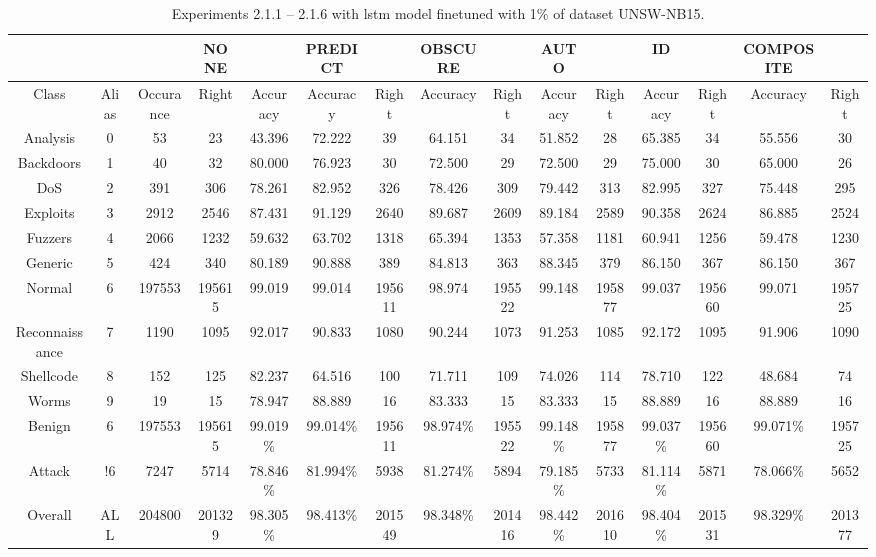 \begin{table}[htb]
    \centering
    \caption{Experiments 2.1.1 – 2.1.6 with \gls{lstm} model finetuned with 1\% of dataset UNSW-NB15.}
    \label{table:results:lstm:flows15_10}
    \begin{tabular}{@{}ccccccccccccccc@{}}
        \toprule
         &  &  & NONE &  & PREDICT &  & OBSCURE &  & AUTO &  & ID &  & COMPOSITE &  \\
        \midrule
        Class &  Alias &  Occurance &  Right &  Accuracy &  Accuracy &  Right &  Accuracy &  Right &  Accuracy &  Right &  Accuracy &  Right &  Accuracy &  Right \\
        Analysis &  0 &  53 &  23 &  43.396 &  72.222 &  39 &  64.151 &  34 &  51.852 &  28 &  65.385 &  34 &  55.556 &  30 \\
        Backdoors &  1 &  40 &  32 &  80.000 &  76.923 &  30 &  72.500 &  29 &  72.500 &  29 &  75.000 &  30 &  65.000 &  26 \\
        DoS &  2 &  391 &  306 &  78.261 &  82.952 &  326 &  78.426 &  309 &  79.442 &  313 &  82.995 &  327 &  75.448 &  295 \\
        Exploits &  3 &  2912 &  2546 &  87.431 &  91.129 &  2640 &  89.687 &  2609 &  89.184 &  2589 &  90.358 &  2624 &  86.885 &  2524 \\
        Fuzzers &  4 &  2066 &  1232 &  59.632 &  63.702 &  1318 &  65.394 &  1353 &  57.358 &  1181 &  60.941 &  1256 &  59.478 &  1230 \\
        Generic &  5 &  424 &  340 &  80.189 &  90.888 &  389 &  84.813 &  363 &  88.345 &  379 &  86.150 &  367 &  86.150 &  367 \\
        Normal &  6 &  197553 &  195615 &  99.019 &  99.014 &  195611 &  98.974 &  195522 &  99.148 &  195877 &  99.037 &  195660 &  99.071 &  195725 \\
        Reconnaissance &  7 &  1190 &  1095 &  92.017 &  90.833 &  1080 &  90.244 &  1073 &  91.253 &  1085 &  92.172 &  1095 &  91.906 &  1090 \\
        Shellcode &  8 &  152 &  125 &  82.237 &  64.516 &  100 &  71.711 &  109 &  74.026 &  114 &  78.710 &  122 &  48.684 &  74 \\
        Worms &  9 &  19 &  15 &  78.947 &  88.889 &  16 &  83.333 &  15 &  83.333 &  15 &  88.889 &  16 &  88.889 &  16 \\
        Benign &  6 &  197553 &  195615 &  99.019\% &  99.014\% &  195611 &  98.974\% &  195522 &  99.148\% &  195877 &  99.037\% &  195660 &  99.071\% &  195725 \\
        Attack &  !6 &  7247 &  5714 &  78.846\% &  81.994\% &  5938 &  81.274\% &  5894 &  79.185\% &  5733 &  81.114\% &  5871 &  78.066\% &  5652 \\
        Overall &  ALL &  204800 &  201329 &  98.305\% &  98.413\% &  201549 &  98.348\% &  201416 &  98.442\% &  201610 &  98.404\% &  201531 &  98.329\% &  201377 \\
        \bottomrule
    \end{tabular}
\end{table}